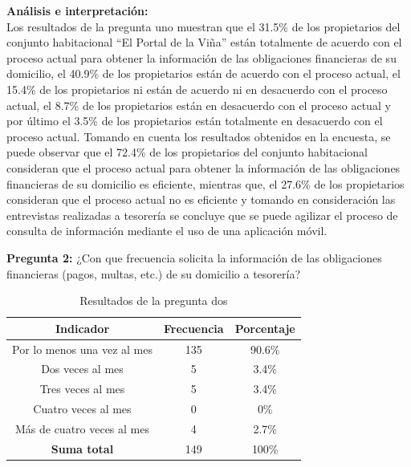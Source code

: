 \textbf{Análisis e interpretación:}\\
Los resultados de la pregunta uno muestran que el 31.5\% de los propietarios del conjunto habitacional {\textquotedblleft}El Portal de la Viña{\textquotedblright} están totalmente de acuerdo con el proceso actual para obtener la información de las obligaciones financieras de su domicilio, el 40.9\% de los propietarios están de acuerdo con el proceso actual, el 15.4\% de los propietarios ni están de acuerdo ni en desacuerdo con el proceso actual, el 8.7\% de los propietarios están en desacuerdo con el proceso actual y por último el 3.5\% de los propietarios están totalmente en desacuerdo con el proceso actual.
Tomando en cuenta los resultados obtenidos en la encuesta, se puede observar que el 72.4\% de los propietarios del conjunto habitacional consideran que el proceso actual para obtener la información de las obligaciones financieras de su domicilio es eficiente, mientras que, el 27.6\% de los propietarios consideran que el proceso actual no es eficiente y tomando en consideración las entrevistas realizadas a tesorería se concluye que se puede agilizar el proceso de consulta de información mediante el uso de una aplicación móvil.
\bigbreak

\textbf{Pregunta 2:} ¿Con que frecuencia solicita la información de las obligaciones financieras (pagos, multas, etc.) de su domicilio a tesorería?

    \begin{table}[H]
              \centering
              \caption{Resultados de la pregunta dos}
              \begin{footnotesize}
              \begin{tabular}{|c|c|c|}
                  \hline
                  \textbf{Indicador} & \textbf{Frecuencia} &  \textbf{Porcentaje} \\
                  \hline
                  Por lo menos una vez al mes & 135 & 90.6\% \\
                  \hline
                  Dos veces al mes & 5 & 3.4\% \\
                  \hline
                  Tres veces al mes
                  & 5 & 3.4\% \\
                  \hline
                  Cuatro veces al mes & 0 & 0\% \\
                  \hline
                  Más de cuatro veces al mes & 4 & 2.7\% \\
                  \hline
                  \textbf{Suma total} & 149 & 100\% \\
                  \hline
              \end{tabular}\label{tab:table_preg_2}
              \end{footnotesize}
    \end{table}

